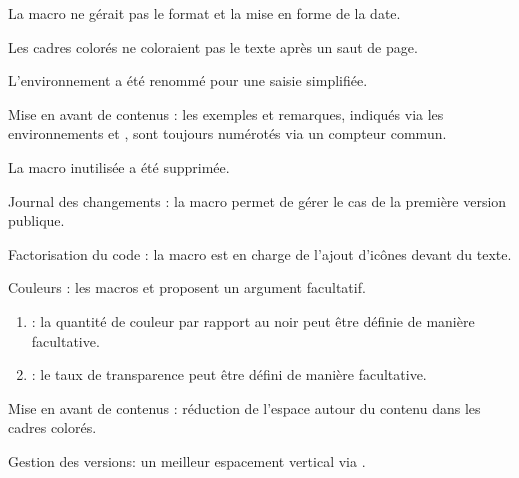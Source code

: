 \begin{tdocfix}
    \item La macro  ne gérait pas le format et la mise en forme de la date.

    \item Les cadres colorés ne coloraient pas le texte après un saut de page.
\end{tdocfix}

\tdocsep




\begin{tdocbreak}[version = 1.4.0, date = 2024-09-28]
    \item L'environnement  a été renommé  pour une saisie simplifiée.

    \item Mise en avant de contenus : les exemples et remarques, indiqués via les environnements  et , sont toujours numérotés via un compteur commun.

    \item La macro inutilisée  a été supprimée.
\end{tdocbreak}


\begin{tdocnew}
    \item Journal des changements : la macro  permet de gérer le cas de la première version publique.

    \item Factorisation du code : la macro  est en charge de l'ajout d'icônes devant du texte.
\end{tdocnew}


\begin{tdocupdate}
    \item Couleurs : les macros  et  proposent un argument facultatif.
    \begin{enumerate}
        \item {} : la quantité de couleur par rapport au noir peut être définie de manière facultative.

        \item {} : le taux de transparence peut être défini de manière facultative.
    \end{enumerate}

    \item Mise en avant de contenus : réduction de l'espace autour du contenu dans les cadres colorés.

    \item Gestion des versions: un meilleur espacement vertical via .
\end{tdocupdate}

